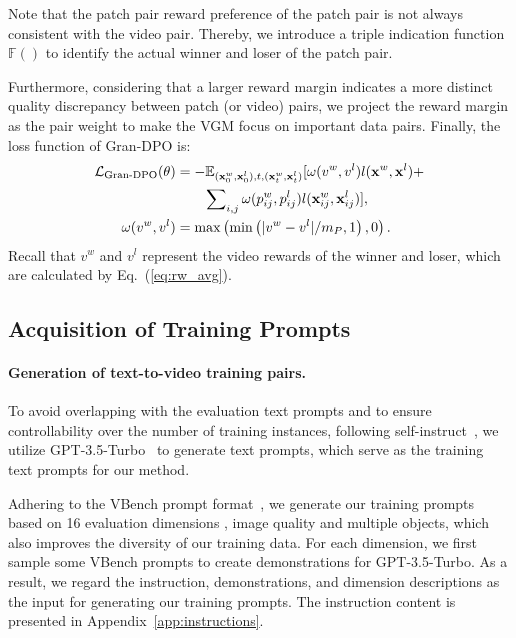 Note that the patch pair reward preference of the patch pair is not always consistent with the video pair. Thereby, we introduce a triple indication function $\mathbb{F}()$ to identify the actual winner and loser of the patch pair. 

Furthermore, considering that a larger reward margin indicates a more distinct quality discrepancy between patch (or video) pairs, we project the reward margin as the pair weight to make the VGM focus on important data pairs. Finally, the loss function of Gran-DPO is:
\begin{align}\small
    \mathcal{L}_{\text{Gran-DPO}}(\theta) &= -\mathbb{E}_{(\mathbf{x}_0^w,\mathbf{x}_0^l),t,(\mathbf{x}_t^w,\mathbf{x}_t^l)}
    [
    \omega(v^w,v^l)l(\mathbf{x}^w,\mathbf{x}^l)+ \nonumber\\ 
    &\quad\quad\sum\nolimits_{i,j}\omega(p^{w}_{ij},p^{l}_{ij})l(\mathbf{x}^{w}_{ij},\mathbf{x}^{l}_{ij})
    ], \nonumber\\
    \omega(v^{w},v^{l}) &= \max\left(\min\left(|v^{w}-v^{l}|/m_P, 1\right), 0\right).
\end{align}
Recall that $v^w$ and $v^l$ represent the video rewards of the winner and loser, which are calculated by Eq.~(\ref{eq:rw_avg}).

\subsection{Acquisition of Training Prompts}\label{sec:prompt}
\paragraph{Generation of text-to-video training pairs.}
To avoid overlapping with the evaluation text prompts and to ensure controllability over the number of training instances, following self-instruct~\cite{self-instruct}, we utilize GPT-3.5-Turbo~\cite{GPT-3.5} to generate text prompts, which serve as the training text prompts for our method.

Adhering to the VBench prompt format~\cite{vbench}, we generate our training prompts based on 16 evaluation dimensions \eg, image quality and multiple objects, which also improves the diversity of our training data. For each dimension, we first sample some VBench prompts to create demonstrations for GPT-3.5-Turbo. As a result, we regard the instruction, demonstrations, and dimension descriptions as the input for generating our training prompts. 
The instruction content is presented in Appendix~\ref{app:instructions}.

